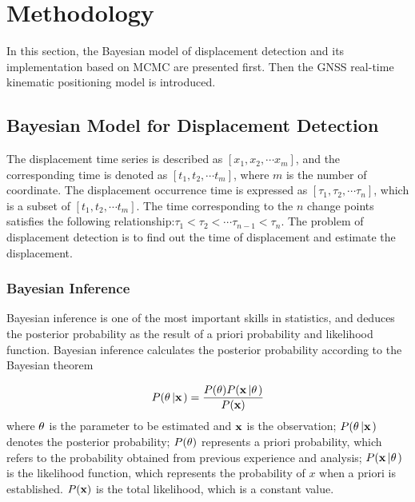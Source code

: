 \documentclass[journal]{IEEEtran}
\begin{document}
	
	
\section{Methodology}
\label{method}
In this section, the Bayesian model of displacement detection and its implementation based on MCMC are presented first. Then the GNSS  real-time kinematic positioning model is introduced.
\subsection{Bayesian Model for Displacement Detection}


The displacement time series is described as $\left[ {{x_1},{x_2}, \cdots {x_m}} \right]$, and the corresponding time is denoted as $\left[ {{t_1},{t_2}, \cdots {t_m}} \right]$, where $m$ is the number of coordinate. The displacement occurrence time is expressed as $\left[ {{\tau _1},{\tau _2}, \cdots {\tau _n}} \right]$, which is a subset of $\left[ {{t_1},{t_2}, \cdots {t_m}} \right]$.  
The time corresponding to the $n$ change points satisfies the following relationship:$ {{\tau _1}<{\tau _2}<\cdots {\tau _{n-1}}<{\tau _n}} $.
The problem of displacement detection is to find out the time of displacement and estimate the displacement.

\subsubsection{Bayesian Inference}
Bayesian inference is one of the most important skills in statistics, and deduces the posterior probability as the result of a priori probability and likelihood function\cite{robert2014machine}. Bayesian inference calculates the posterior probability according to the Bayesian theorem\cite{chen2009modulation,chen2013bayesian}

\begin{equation}\label{eq_bayesian_inference}
P({\bf{\theta }}\left| {\bf{x}} \right.) = \frac{{P({\bf{\theta }})P({\bf{x}}\left| {\bf{\theta }} \right.)}}{{P({\bf{x}})}}
\end{equation}
where $\bf{\theta }$ is the parameter to be estimated and $\bf{x}$ is the observation; $P({\bf{\theta }}\left| {\bf{x}} \right.)$ denotes the posterior probability; $P({\bf{\theta }})$ represents a priori probability, which refers to the probability obtained from previous experience and analysis;
$P({\bf{x}}\left| {\bf{\theta }} \right.)$ is the likelihood function, which represents the probability of $x$ when a priori is established. ${P({\bf{x}})}$ is the total likelihood, which is a constant value.
\end{document}
